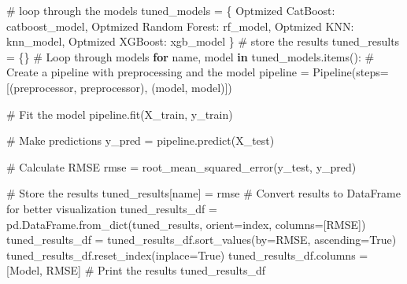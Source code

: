 \documentclass[
  letterpaper,
  DIV=11,
  numbers=noendperiod]{scrreprt}
\newenvironment{Shaded}{\begin{snugshade}}{\end{snugshade}}
\newcommand{\CommentTok}[1]{\textcolor[rgb]{0.37,0.37,0.37}{#1}}
\newcommand{\ControlFlowTok}[1]{\textcolor[rgb]{0.00,0.23,0.31}{\textbf{#1}}}
\newcommand{\KeywordTok}[1]{\textcolor[rgb]{0.00,0.23,0.31}{\textbf{#1}}}
\newcommand{\NormalTok}[1]{\textcolor[rgb]{0.00,0.23,0.31}{#1}}
\newcommand{\OperatorTok}[1]{\textcolor[rgb]{0.37,0.37,0.37}{#1}}
\newcommand{\StringTok}[1]{\textcolor[rgb]{0.13,0.47,0.30}{#1}}
\newcommand{\VariableTok}[1]{\textcolor[rgb]{0.07,0.07,0.07}{#1}}
\begin{document}
\begin{Shaded}
\begin{Highlighting}[]
\CommentTok{\# loop through the models}
\NormalTok{tuned\_models }\OperatorTok{=}\NormalTok{ \{}
    \StringTok{\textquotesingle{}Optmized CatBoost\textquotesingle{}}\NormalTok{: catboost\_model,}
    \StringTok{\textquotesingle{}Optmized Random Forest\textquotesingle{}}\NormalTok{: rf\_model,}
    \StringTok{\textquotesingle{}Optmized KNN\textquotesingle{}}\NormalTok{: knn\_model,}
    \StringTok{\textquotesingle{}Optmized XGBoost\textquotesingle{}}\NormalTok{: xgb\_model}
\NormalTok{\}}
\CommentTok{\# store the results}
\NormalTok{tuned\_results }\OperatorTok{=}\NormalTok{ \{\}}
\CommentTok{\# Loop through models}
\ControlFlowTok{for}\NormalTok{ name, model }\KeywordTok{in}\NormalTok{ tuned\_models.items():}
    \CommentTok{\# Create a pipeline with preprocessing and the model}
\NormalTok{    pipeline }\OperatorTok{=}\NormalTok{ Pipeline(steps}\OperatorTok{=}\NormalTok{[(}\StringTok{\textquotesingle{}preprocessor\textquotesingle{}}\NormalTok{, preprocessor),}
\NormalTok{                               (}\StringTok{\textquotesingle{}model\textquotesingle{}}\NormalTok{, model)])}
    
    \CommentTok{\# Fit the model}
\NormalTok{    pipeline.fit(X\_train, y\_train)}
    
    \CommentTok{\# Make predictions}
\NormalTok{    y\_pred }\OperatorTok{=}\NormalTok{ pipeline.predict(X\_test)}
    
    \CommentTok{\# Calculate RMSE}
\NormalTok{    rmse }\OperatorTok{=}\NormalTok{ root\_mean\_squared\_error(y\_test, y\_pred)}
    
    \CommentTok{\# Store the results}
\NormalTok{    tuned\_results[name] }\OperatorTok{=}\NormalTok{ rmse}
\CommentTok{\# Convert results to DataFrame for better visualization}
\NormalTok{tuned\_results\_df }\OperatorTok{=}\NormalTok{ pd.DataFrame.from\_dict(tuned\_results, orient}\OperatorTok{=}\StringTok{\textquotesingle{}index\textquotesingle{}}\NormalTok{, columns}\OperatorTok{=}\NormalTok{[}\StringTok{\textquotesingle{}RMSE\textquotesingle{}}\NormalTok{])}
\NormalTok{tuned\_results\_df }\OperatorTok{=}\NormalTok{ tuned\_results\_df.sort\_values(by}\OperatorTok{=}\StringTok{\textquotesingle{}RMSE\textquotesingle{}}\NormalTok{, ascending}\OperatorTok{=}\VariableTok{True}\NormalTok{)}
\NormalTok{tuned\_results\_df.reset\_index(inplace}\OperatorTok{=}\VariableTok{True}\NormalTok{)}
\NormalTok{tuned\_results\_df.columns }\OperatorTok{=}\NormalTok{ [}\StringTok{\textquotesingle{}Model\textquotesingle{}}\NormalTok{, }\StringTok{\textquotesingle{}RMSE\textquotesingle{}}\NormalTok{]}
\CommentTok{\# Print the results}
\NormalTok{tuned\_results\_df}
\end{Highlighting}
\end{Shaded}
\end{document}
